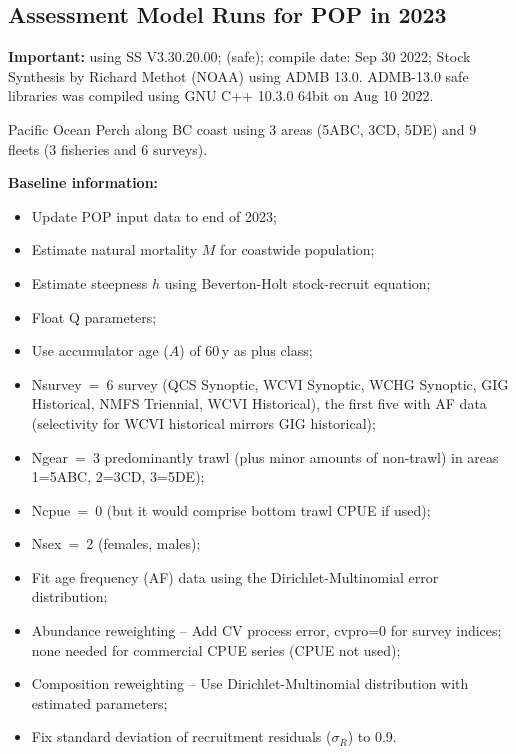 
\subsection{Assessment Model Runs for POP in 2023}

\textbf{Important:} using SS V3.30.20.00; (safe); compile date: Sep 30 2022; Stock Synthesis by Richard Methot (NOAA) using ADMB 13.0.
ADMB-13.0 safe libraries was compiled using GNU C++ 10.3.0 64bit on Aug 10 2022.

Pacific Ocean Perch along BC coast using 3 areas (5ABC, 3CD, 5DE) and 9 fleets (3 fisheries and 6 surveys).

\textbf{Baseline information:}
\begin{itemize}
  \item Update POP input data to end of 2023;
  \item Estimate natural mortality $M$ for coastwide population;
  \item Estimate steepness $h$ using Beverton-Holt stock-recruit equation;
  \item Float Q parameters;
  \item Use accumulator age ($A$) of 60\,y as plus class;
  \item Nsurvey~=~6 survey (QCS Synoptic, WCVI Synoptic, WCHG Synoptic, GIG Historical, NMFS Triennial, WCVI Historical),
        the first five with AF data (selectivity for WCVI historical mirrors GIG historical);
  \item Ngear~=~3 predominantly trawl (plus minor amounts of non-trawl) in areas 1=5ABC, 2=3CD, 3=5DE);
  \item Ncpue~=~0 (but it would comprise bottom trawl CPUE if used);
  \item Nsex~=~2 (females, males);
  \item Fit age frequency (AF) data using the Dirichlet-Multinomial error distribution;
  \item Abundance reweighting -- Add CV process error, cvpro=0 for survey indices; none needed for commercial CPUE series (CPUE not used);
  \item Composition reweighting -- Use Dirichlet-Multinomial distribution with estimated parameters; %
  \item Fix standard deviation of recruitment residuals ($\sigma_R$) to 0.9.
\end{itemize}

